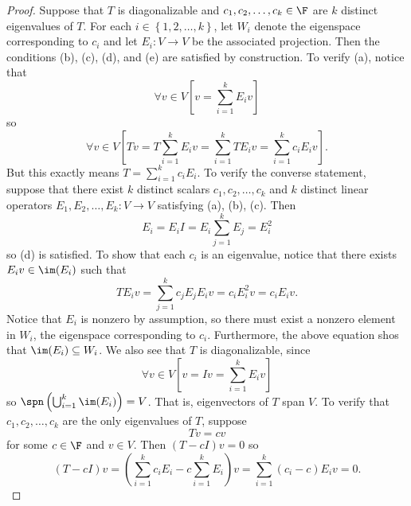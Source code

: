 \documentclass[math_245.tex]{subfiles}
\begin{document}
    \begin{proof}
        Suppose that $T$ is diagonalizable and $c_1, c_2, \ldots, c_k\in \F$ are $k$ distinct eigenvalues of $T$. For each $i\in \left\lbrace 1, 2, \ldots, k \right\rbrace$, let $W_i$ denote the eigenspace corresponding to $c_i$ and let $E_i:V\to V$ be the associated projection. Then the conditions (b), (c), (d), and (e) are satisfied by construction. To verify (a), notice that
        \begin{equation*}
            \forall v\in V \left[ v = \sum^{k}_{i=1} E_iv \right] 
        \end{equation*}
        so
        \begin{equation*}
            \forall v\in V \left[ Tv = T \sum^{k}_{i=1} E_iv = \sum^{k}_{i=1} TE_iv = \sum^{k}_{i=1} c_iE_iv \right].
        \end{equation*}
        But this exactly means $T = \sum^{k}_{i=1} c_iE_i$. To verify the converse statement, suppose that there exist $k$ distinct scalars $c_1, c_2, \ldots, c_k$ and $k$ distinct linear operators $E_1, E_2, \ldots, E_k:V\to V$ satisfying (a), (b), (c). Then
        \begin{equation*}
            E_i = E_iI = E_i \sum^{k}_{j=1} E_j = E_i^2
        \end{equation*} 
        so (d) is satisfied. To show that each $c_i$ is an eigenvalue, notice that there exists $E_iv\in \im(E_i)$ such that
        \begin{equation*}
            TE_iv = \sum^{k}_{j=1} c_jE_jE_iv = c_iE_i^2v = c_iE_iv.
        \end{equation*}
        Notice that $E_i$ is nonzero by assumption, so there must exist a nonzero element in $W_i$, the eigenspace corresponding to $c_i$. Furthermore, the above equation shos that $\im(E_i)\subseteq W_i$. We also see that $T$ is diagonalizable, since
        \begin{equation*}
            \forall v\in V \left[ v = Iv = \sum^{k}_{i=1} E_iv \right] 
        \end{equation*}
        so $\spn \left( \bigcup^{k}_{i=1} \im(E_i) \right) = V$. That is, eigenvectors of $T$ span $V$. To verify that $c_1, c_2, \ldots, c_k$ are the only eigenvalues of $T$, suppose
        \begin{equation*}
            Tv = cv
        \end{equation*}
        for some $c\in \F$ and $v\in V$. Then $(T-cI)v = 0$ so
        \begin{equation*}
            (T-cI)v = \left( \sum^{k}_{i=1} c_iE_i - c \sum^{k}_{i=1} E_i \right) v = \sum^{k}_{i=1} (c_i-c) E_iv = 0.

\end{equation*}
\end{proof}
\end{document}
